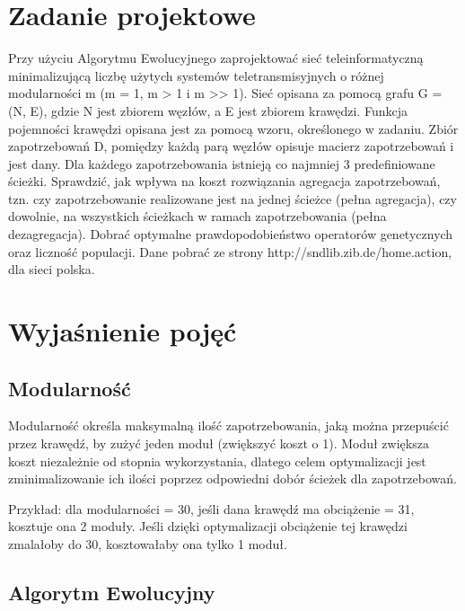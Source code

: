 \section{Zadanie projektowe}

Przy użyciu Algorytmu Ewolucyjnego zaprojektować sieć teleinformatyczną minimalizującą liczbę użytych systemów teletransmisyjnych o różnej modularności m (m = 1, m > 1 i m >> 1). Sieć opisana za pomocą grafu G = (N, E), gdzie N jest zbiorem węzłów, a E jest zbiorem krawędzi. Funkcja pojemności krawędzi opisana jest za pomocą wzoru, określonego w zadaniu. Zbiór zapotrzebowań D, pomiędzy każdą parą węzłów opisuje macierz zapotrzebowań i jest dany. Dla
każdego zapotrzebowania istnieją co najmniej 3 predefiniowane ścieżki. Sprawdzić,
jak wpływa na koszt rozwiązania agregacja zapotrzebowań, tzn. czy zapotrzebowanie realizowane jest na jednej ścieżce (pełna agregacja), czy dowolnie, na
wszystkich ścieżkach w ramach zapotrzebowania (pełna dezagregacja). Dobrać
optymalne prawdopodobieństwo operatorów genetycznych oraz liczność populacji. Dane pobrać ze strony http://sndlib.zib.de/home.action, dla sieci polska.

\section{Wyjaśnienie pojęć}
\label{section:explanation}

\subsection{Modularność}

Modularność określa maksymalną ilość zapotrzebowania, jaką można przepuścić przez krawędź, by zużyć jeden moduł (zwiększyć koszt o 1). Moduł zwiększa koszt niezależnie od stopnia wykorzystania, dlatego celem optymalizacji jest zminimalizowanie ich ilości poprzez odpowiedni dobór ścieżek dla zapotrzebowań.

Przykład: dla modularności = 30, jeśli dana krawędź ma obciążenie = 31, kosztuje ona 2 moduły. Jeśli dzięki optymalizacji obciążenie tej krawędzi zmalałoby do 30, kosztowałaby ona tylko 1 moduł.

\subsection{Algorytm Ewolucyjny}

